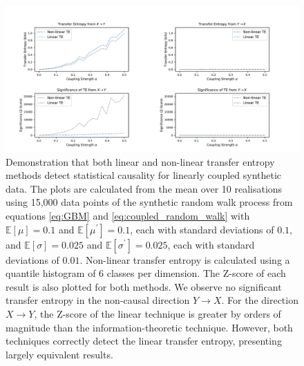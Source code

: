 \documentclass[]{rsos}%
\begin{document}
{  \begin{figure}[!htb]
    \includegraphics[width=\linewidth]{images/confirming_gbm.pdf}
    \caption{Demonstration that both linear and non-linear transfer entropy methods detect statistical causality for linearly coupled synthetic data. The plots are calculated from the mean over 10 realisations using 15,000 data points of the synthetic random walk process from equations \ref{eq:GBM} and \ref{eq:coupled_random_walk} with $\mathbb{E} [\mu]=0.1$ and $\mathbb{E} [\mu^{\prime}]=0.1$, each with standard deviations of $0.1$, and $\mathbb{E} [\sigma]=0.025$ and $\mathbb{E} [\sigma^{\prime}]=0.025$, each with standard deviations of $0.01$.
    Non-linear transfer entropy is calculated using a quantile histogram of 6 classes per dimension. The Z-score of each result is also plotted for both methods. We observe no significant transfer entropy in the non-causal direction $Y \rightarrow X$. For the direction $X \rightarrow Y$, the Z-score of the linear technique is greater by orders of magnitude than the information-theoretic technique. However, both techniques correctly detect the linear transfer entropy, presenting largely equivalent results.}
    \label{fig:GBM_confirmation}


\end{figure}}
\end{document}
